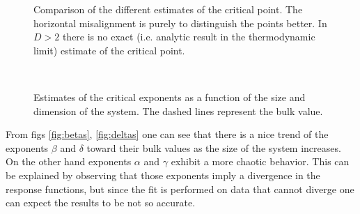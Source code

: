 \documentclass[a4paper, 11pt]{article}
\begin{document}
      \begin{figure}[H]
        \centering
        \begin{subfigure}[]{
          \label{fig:D2_k_c}}
        \end{subfigure}
        \begin{subfigure}[]{
          \label{fig:D3_k_c}}
        \end{subfigure}
        \begin{subfigure}[]{
          \label{fig:D4_k_c}}
        \end{subfigure}
        \caption{Comparison of the different estimates of the critical point. The horizontal misalignment is purely to distinguish the points better. In $D > 2$ there is no exact (i.e. analytic result in the thermodynamic limit) estimate of the critical point.}
      \end{figure}

      \begin{figure}[H]
        \centering
        \begin{subfigure}[Solid $\alpha_1$, dotted $\alpha_2$]{
          \label{fig:alphas}}
        \end{subfigure}
        \begin{subfigure}[]{
          \label{fig:betas}}
        \end{subfigure} \\
        \begin{subfigure}[Solid $\gamma_1$, dotted $\gamma_2$]{
          \label{fig:gammas}}
        \end{subfigure}
        \begin{subfigure}[]{
          \label{fig:deltas}}
        \end{subfigure}
        \caption{Estimates of the critical exponents as a function of the size and dimension of the system. The dashed lines represent the bulk value.}
      \end{figure}

      From figs \ref{fig:betas}, \ref{fig:deltas} one can see that there is a nice trend of the exponents $\beta$ and $\delta$ toward their bulk values as the size of the system increases. On the other hand exponents $\alpha$ and $\gamma$ exhibit a more chaotic behavior. This can be explained by observing that those exponents imply a divergence in the response functions, but since the fit is performed on data that cannot diverge one can expect the results to be not so accurate.
\end{document}
